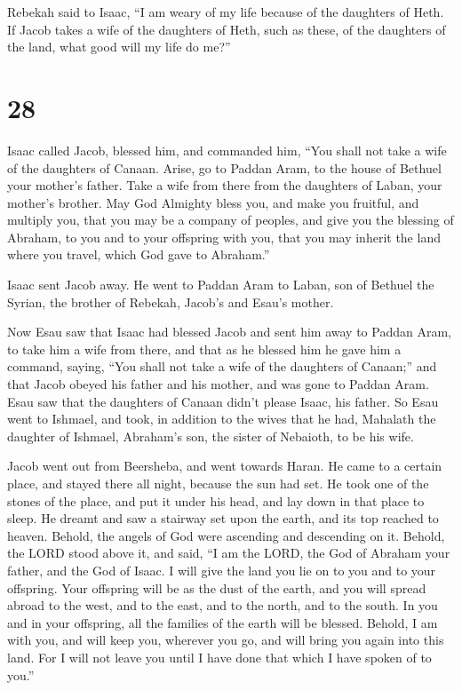  Rebekah said to Isaac, ``I am weary of my life because of
the daughters of Heth. If Jacob takes a wife of the daughters of Heth,
such as these, of the daughters of the land, what good will my life do
me?''

\hypertarget{section-27}{%
\section{28}\label{section-27}}

 Isaac called Jacob, blessed him, and commanded him, ``You
shall not take a wife of the daughters of Canaan.  Arise, go
to Paddan Aram, to the house of Bethuel your mother's father. Take a
wife from there from the daughters of Laban, your mother's brother.
 May God Almighty bless you, and make you fruitful, and
multiply you, that you may be a company of peoples,  and
give you the blessing of Abraham, to you and to your offspring with you,
that you may inherit the land where you travel, which God gave to
Abraham.''

 Isaac sent Jacob away. He went to Paddan Aram to Laban, son
of Bethuel the Syrian, the brother of Rebekah, Jacob's and Esau's
mother.

 Now Esau saw that Isaac had blessed Jacob and sent him away
to Paddan Aram, to take him a wife from there, and that as he blessed
him he gave him a command, saying, ``You shall not take a wife of the
daughters of Canaan;''  and that Jacob obeyed his father and
his mother, and was gone to Paddan Aram.  Esau saw that the
daughters of Canaan didn't please Isaac, his father.  So
Esau went to Ishmael, and took, in addition to the wives that he had,
Mahalath the daughter of Ishmael, Abraham's son, the sister of Nebaioth,
to be his wife.

 Jacob went out from Beersheba, and went towards Haran.
 He came to a certain place, and stayed there all night,
because the sun had set. He took one of the stones of the place, and put
it under his head, and lay down in that place to sleep.  He
dreamt and saw a stairway set upon the earth, and its top reached to
heaven. Behold, the angels of God were ascending and descending on it.
 Behold, the LORD stood above it, and said, ``I am the
LORD, the God of Abraham your father, and the God of Isaac. I will give
the land you lie on to you and to your offspring.  Your
offspring will be as the dust of the earth, and you will spread abroad
to the west, and to the east, and to the north, and to the south. In you
and in your offspring, all the families of the earth will be blessed.
 Behold, I am with you, and will keep you, wherever you go,
and will bring you again into this land. For I will not leave you until
I have done that which I have spoken of to you.''

